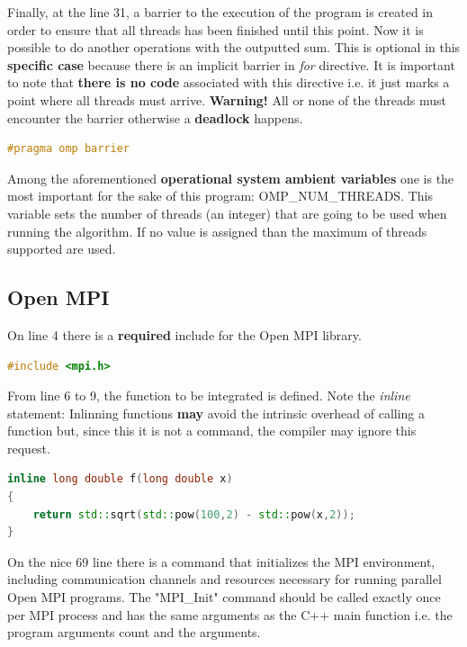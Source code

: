 		\par Finally, at the line 31, a barrier to the execution of the program is created in order to ensure that all threads has been finished until this point. Now it is possible to do another operations with the outputted sum.  This is optional in this \textbf{specific case} because there is an implicit barrier in \textit{for} directive. It is important to note that \textbf{there is no code} associated with this directive i.e. it just marks a point where all threads must arrive. \textbf{Warning!} All or none of the threads must encounter the barrier otherwise a \textbf{deadlock} happens.
		
		\begin{lstlisting}[language=C++]
#pragma omp barrier
		\end{lstlisting}
	
		\par Among the aforementioned \textbf{operational system ambient variables} one is the most important for the sake of this program: OMP\_NUM\_THREADS. This variable sets the number of threads (an integer) that are going to be used when running the algorithm. If no value is assigned than the maximum of threads supported are used.
		
		\subsection{Open MPI}
		\par On line 4 there is a \textbf{required} include for the Open MPI library.
		\begin{lstlisting}[language=C++]
#include <mpi.h>
		\end{lstlisting}
	
		\par From line 6 to 9, the function to be integrated is defined. Note the \textit{inline} statement: Inlinning functions \textbf{may} avoid the intrinsic overhead of calling a function but, since this it is not a command, the compiler may ignore this request.
		
		\begin{lstlisting}[language=C++]
inline long double f(long double x)
{
	return std::sqrt(std::pow(100,2) - std::pow(x,2));
}
		\end{lstlisting}
	
	
		\par On the nice 69 line there is a command that initializes the MPI environment, including communication channels and resources necessary for running parallel Open MPI programs. The "MPI\_Init" command should be called exactly once per MPI process and has the same arguments as the C++ main function i.e. the program arguments count and the arguments.
		
